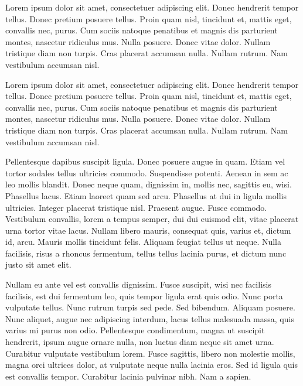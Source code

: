 \documentclass{hacett-socsci-thesis}
\begin{document}
Lorem ipsum dolor sit amet, consectetuer adipiscing elit.  Donec
hendrerit tempor tellus.  Donec pretium posuere tellus.  Proin quam
nisl, tincidunt et, mattis eget, convallis nec, purus.  Cum sociis
natoque penatibus et magnis dis parturient montes, nascetur ridiculus
mus.  Nulla posuere.  Donec vitae dolor.  Nullam tristique diam non
turpis.  Cras placerat accumsan nulla.  Nullam rutrum.  Nam vestibulum
accumsan nisl.

Lorem ipsum dolor sit amet, consectetuer adipiscing elit.  Donec
hendrerit tempor tellus.  Donec pretium posuere tellus.  Proin quam
nisl, tincidunt et, mattis eget, convallis nec, purus.  Cum sociis
natoque penatibus et magnis dis parturient montes, nascetur ridiculus
mus.  Nulla posuere.  Donec vitae dolor.  Nullam tristique diam non
turpis.  Cras placerat accumsan nulla.  Nullam rutrum.  Nam vestibulum
accumsan nisl.

Pellentesque dapibus suscipit ligula.  Donec posuere augue in quam.
Etiam vel tortor sodales tellus ultricies commodo.  Suspendisse
potenti.  Aenean in sem ac leo mollis blandit.  Donec neque quam,
dignissim in, mollis nec, sagittis eu, wisi.  Phasellus lacus.  Etiam
laoreet quam sed arcu.  Phasellus at dui in ligula mollis ultricies.
Integer placerat tristique nisl.  Praesent augue.  Fusce commodo.
Vestibulum convallis, lorem a tempus semper, dui dui euismod elit,
vitae placerat urna tortor vitae lacus.  Nullam libero mauris,
consequat quis, varius et, dictum id, arcu.  Mauris mollis tincidunt
felis.  Aliquam feugiat tellus ut neque.  Nulla facilisis, risus a
rhoncus fermentum, tellus tellus lacinia purus, et dictum nunc justo
sit amet elit.

\HSTconcl

Nullam eu ante vel est convallis dignissim.  Fusce suscipit, wisi nec
facilisis facilisis, est dui fermentum leo, quis tempor ligula erat
quis odio.  Nunc porta vulputate tellus.  Nunc rutrum turpis sed pede.
Sed bibendum.  Aliquam posuere.  Nunc aliquet, augue nec adipiscing
interdum, lacus tellus malesuada massa, quis varius mi purus non odio.
Pellentesque condimentum, magna ut suscipit hendrerit, ipsum augue
ornare nulla, non luctus diam neque sit amet urna.  Curabitur
vulputate vestibulum lorem.  Fusce sagittis, libero non molestie
mollis, magna orci ultrices dolor, at vulputate neque nulla lacinia
eros.  Sed id ligula quis est convallis tempor.  Curabitur lacinia
pulvinar nibh.  Nam a sapien.

\HSTbib
\end{document}
